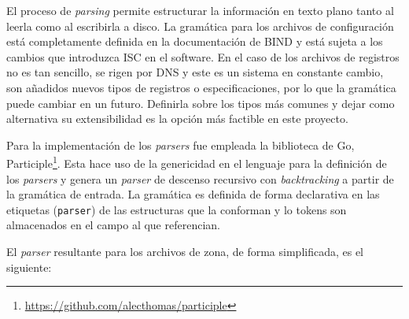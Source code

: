 El proceso de \textit{parsing} permite estructurar la información en texto plano tanto al leerla como al escribirla a disco. La gramática para los archivos de configuración está completamente definida en la documentación de BIND y está sujeta a los cambios que introduzca ISC en el software. En el caso de los archivos de registros no es tan sencillo, se rigen por DNS y este es un sistema en constante cambio, son añadidos nuevos tipos de registros o especificaciones, por lo que la gramática puede cambiar en un futuro. Definirla sobre los tipos más comunes y dejar como alternativa su extensibilidad es la opción más factible en este proyecto.

Para la implementación de los \textit{parsers} fue empleada la biblioteca de Go, Participle\footnote{\url{https://github.com/alecthomas/participle}}. Esta hace uso de la genericidad en el lenguaje para la definición de los \textit{parsers} y genera un \textit{parser} de descenso recursivo con \textit{backtracking} a partir de la gramática de entrada. La gramática es definida de forma declarativa en las etiquetas (\verb|parser|) de las estructuras que la conforman y lo tokens son almacenados en el campo al que referencian.

El \textit{parser} resultante para los archivos de zona, de forma simplificada, es el siguiente:

